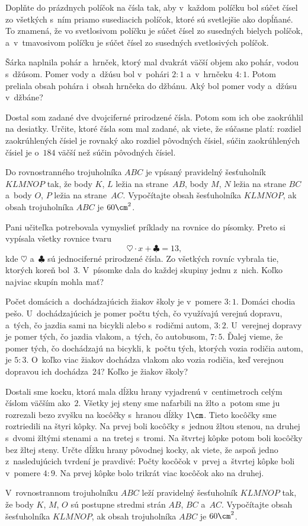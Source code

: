 {%
Doplňte do prázdnych políčok na \obr{} čísla tak, aby v~každom políčku bol súčet čísel zo všetkých s~ním priamo susediacich políčok, ktoré sú svetlejšie ako dopĺňané. To znamená, že vo svetlosivom políčku je súčet čísel zo susedných bielych políčok, a~v~tmavosivom políčku je súčet čísel zo susedných svetlosivých políčok.
%
}

{%
Šárka naplnila pohár a~hrnček, ktorý mal dvakrát väčší objem ako pohár, vodou s~džúsom. Pomer vody a~džúsu bol v~pohári $2:1$ a~v~hrnčeku $4:1$. Potom preliala obsah pohára i~obsah hrnčeka do džbánu. Aký bol pomer vody a~džúsu v~džbáne?}

{%
Dostal som zadané dve dvojciferné prirodzené čísla. Potom som ich obe zaokrúhlil na desiatky. Určite, ktoré čísla som mal zadané, ak viete, že súčasne platí:
\itemitem{$\bullet$} rozdiel zaokrúhlených čísiel je rovnaký ako rozdiel pôvodných čísiel,
\itemitem{$\bullet$} súčin zaokrúhlených čísiel je o~$184$ väčší než súčin pôvodných čísiel.
}

{%
Do rovnostranného trojuholníka $ABC$ je vpísaný pravidelný šesťuholník $KLMNOP$ tak, že body $K$, $L$ ležia na strane~$AB$, body $M$, $N$ ležia na strane $BC$ a~body $O$, $P$ ležia na strane~$AC$. Vypočítajte obsah šesťuholníka $KLMNOP$, ak obsah trojuholníka $ABC$ je $60\cm^2$.}

{%
Pani učiteľka potrebovala vymyslieť príklady na rovnice do písomky. Preto si vypísala všetky rovnice tvaru
$$
\heartsuit\cdot x + \clubsuit = 13,
$$
kde $\heartsuit$ a~$\clubsuit$ sú jednociferné prirodzené čísla. Zo všetkých rovníc vybrala tie, ktorých koreň bol~$3$. V~písomke dala do každej skupiny jednu z~nich. Koľko najviac skupín mohla mať?
}

{%
Počet domácich a~dochádzajúcich žiakov školy je v~pomere $3:1$. Domáci chodia pešo. U~dochádzajúcich je pomer počtu tých, čo využívajú verejnú dopravu, a~tých, čo jazdia sami na bicykli alebo s~rodičmi autom, $3:2$. U~verejnej dopravy je pomer tých, čo jazdia vlakom, a~tých, čo autobusom, $7:5$. Ďalej vieme, že pomer tých, čo dochádzajú na bicykli, k~počtu tých, ktorých vozia rodičia autom, je $5:3$. O~koľko viac žiakov dochádza vlakom ako vozia rodičia, keď verejnou dopravou ich dochádza~24? Koľko je žiakov školy?}

{%
Dostali sme kocku, ktorá mala dĺžku hrany vyjadrenú v~centimetroch celým číslom väčším ako~$2$. Všetky jej steny sme nafarbili na žlto a~potom sme ju rozrezali bezo zvyšku na kocôčky s~hranou dĺžky $1\cm$. Tieto kocôčky sme roztriedili na štyri kôpky. Na prvej boli kocôčky s~jednou žltou stenou, na druhej s~dvomi žltými stenami a~na tretej s~tromi. Na štvrtej kôpke potom boli kocôčky bez žltej steny.
Určte dĺžku hrany pôvodnej kocky, ak viete, že aspoň jedno z~nasledujúcich tvrdení je pravdivé:
  \ite{$\bullet$} Počty kocôčok v~prvej a~štvrtej kôpke boli v~pomere $4:9$.
  \ite{$\bullet$} Na prvej kôpke bolo trikrát viac kocôčok ako na druhej.
}

{%
V~rovnostrannom trojuholníku $ABC$ leží pravidelný šesťuholník $KLMNOP$ tak, že body $K$, $M$, $O$ sú postupne stredmi strán $AB$, $BC$ a~$AC$. Vypočítajte obsah šesťuholníka $KLMNOP$, ak obsah trojuholníka $ABC$ je $60\cm^2$.}

